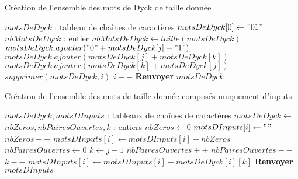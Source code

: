 \begin{algorithm}[H]
\caption{Création de l'ensemble des mots de Dyck de taille donnée}
\label{alg:logic_to_mot/algorithmes/1}
\begin{algorithmic}
\State $motsDeDyck$ : tableau de chaînes de caractères
\State $motsDeDyck[0] \gets "01"$ 
\State $nbMotsDeDyck$ : entier
\State $nbMotsDeDyck \gets taille(motsDeDyck)$
\State $motsDeDyck.ajouter("0" + motsDeDyck[j] + "1")$ 
 
\State $motsDeDyck.ajouter(motsDeDyck[j] + motsDeDyck[k])$
\State $motsDeDyck.ajouter(motsDeDyck[k] + motsDeDyck[j])$
\EndFor
\EndFor
\EndFor
{}
\State $supprimer(motsDeDyck, i)$ 
\State $i--$
\EndIf
\EndFor
\State \textbf{Renvoyer} $motsDeDyck$
\EndProcedure
\end{algorithmic}
\end{algorithm}

\begin{algorithm}[H]
\caption{Création de l'ensemble des mots de taille donnée composés uniquement d'inputs}
\label{alg:logic_to_mot/algorithmes/2}
\begin{algorithmic}
\State $motsDeDyck, motsDInputs$ : tableaux de chaînes de caractères
\State $motsDeDyck \gets$ 
\State $nbZeros, nbPairesOuvertes, k$ : entiers
 
\State $nbZeros \gets 0$
 
\State $motsDInputs[i] \gets ""$
 
\State $nbZeros++$ 
\State $motsDInputs[i] \gets motsDInputs[i] + nbZeros$
\Else {}
\State $nbPairesOuvertes \gets 0$ 
\State $k \gets j - 1$ 
\State $nbPairesOuvertes++$
\Else
\State $nbPairesOuvertes--$
\EndIf
\State $k--$
\EndWhile
\State $motsDInputs[i] \gets motsDInputs[i] + motsDeDyck[i][k]$ 
\EndIf
\EndFor
\EndFor
\State \textbf{Renvoyer} $motsDInputs$
\EndProcedure
\end{algorithmic}
\end{algorithm}


